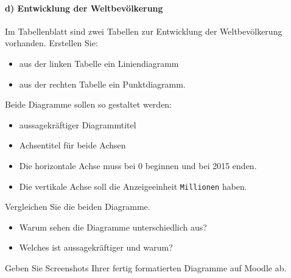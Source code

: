 \begin{mysubmission}[Diagramme]
    \paragraph*{d) Entwicklung der Weltbevölkerung}
    Im Tabellenblatt sind zwei Tabellen zur Entwicklung der Weltbevölkerung vorhanden. Erstellen Sie:
    \begin{itemize}
        \item aus der linken Tabelle ein Liniendiagramm
        \item aus der rechten Tabelle ein Punktdiagramm.
    \end{itemize}
    Beide Diagramme sollen so gestaltet werden:
    \begin{itemize}
        \item aussagekräftiger Diagrammtitel
        \item Achsentitel für beide Achsen
        \item Die horizontale Achse muss bei 0 beginnen und bei 2015 enden.
        \item Die vertikale Achse soll die Anzeigeeinheit \texttt{Millionen} haben.
    \end{itemize}

    Vergleichen Sie die beiden Diagramme.
    \begin{itemize}
        \item Warum sehen die Diagramme unterschiedlich aus?
        \item Welches ist aussagekräftiger und warum?
    \end{itemize}

    Geben Sie Screenshots Ihrer fertig formatierten Diagramme auf Moodle ab.

    \begin{myanswer}


\end{myanswer}
\end{mysubmission}
